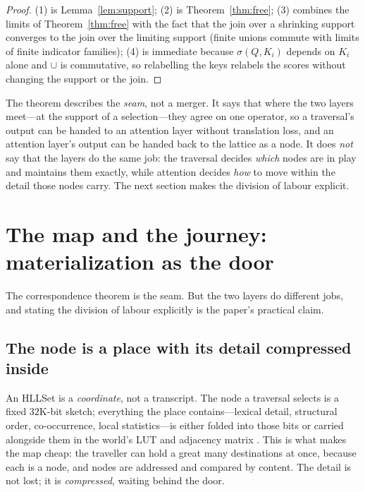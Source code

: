\documentclass[11pt,a4paper]{article}
\theoremstyle{remark}
\newcommand{\sigm}{\ensuremath{\sigma}}                 %
\begin{document}
\begin{proof}
(1) is Lemma~\ref{lem:support}; (2) is Theorem~\ref{thm:free}; (3) combines the
limits of Theorem~\ref{thm:free} with the fact that the join over a shrinking
support converges to the join over the limiting support (finite unions commute
with limits of finite indicator families); (4) is immediate because
$\sigm(Q,K_i)$ depends on $K_i$ alone and $\cup$ is commutative, so relabelling
the keys relabels the scores without changing the support or the join.
\end{proof}

The theorem describes the \emph{seam}, not a merger. It says that where the two
layers meet---at the support of a selection---they agree on one operator, so a
traversal's output can be handed to an attention layer without translation
loss, and an attention layer's output can be handed back to the lattice as a
node. It does \emph{not} say that the layers do the same job: the traversal
decides \emph{which} nodes are in play and maintains them exactly, while
attention decides \emph{how} to move within the detail those nodes carry. The
next section makes the division of labour explicit.

\section{The map and the journey: materialization as the door}
\label{sec:map}

The correspondence theorem is the seam. But the two layers do different jobs,
and stating the division of labour explicitly is the paper's practical claim.

\subsection{The node is a place with its detail compressed inside}

An HLLSet is a \emph{coordinate}, not a transcript. The node a traversal selects
is a fixed $32$K-bit sketch; everything the place contains---lexical detail,
structural order, co-occurrence, local statistics---is either folded into those
bits or carried alongside them in the world's LUT and adjacency matrix
\cite{ctx2026}. This is what makes the map cheap: the traveller can hold a great
many destinations at once, because each is a node, and nodes are addressed and
compared by content. The detail is not lost; it is \emph{compressed}, waiting
behind the door.
\end{document}
